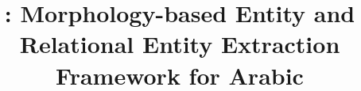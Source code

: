 \documentclass[english,utf8x]{article-hermes}
\title[\framework]{\framework: Morphology-based Entity and Relational Entity Extraction Framework for Arabic}
\author{}
\begin{document}
\maketitlepage
\end{document}
